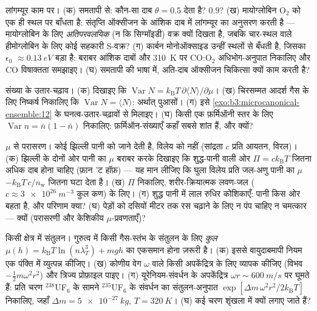 \begin{exercise}[$\star\star$]\label{exo:b3:grand-canonical:6}
लांगम्यूर काम पर। (क) समतापी से: कौन-सा दाब
$\theta = 0.5$ देता है? $0.9$? (ख) मायोग्लोबिन O$_2$ को एक ही स्थल
पर बाँधता है: संतृप्ति ऑक्सीजन के आंशिक दाब में लांगम्यूर का
अनुसरण करती है --- मायोग्लोबिन के लिए \emph{अतिपरवलयिक} (न कि
सिग्मॉइडी) वक्र क्यों दिखता है, जबकि चार-स्थल वाले हीमोग्लोबिन के लिए
कोई सहकारी S-वक्र? (ग) कार्बन मोनोऑक्साइड उन्हीं स्थलों से बँधती है,
जिसका $\epsilon_0$ $\approx\qty{0.13}{eV}$ बड़ा है: बराबर आंशिक दाबों
और \qty{310}{K} पर CO:O$_2$ अधिभोग-अनुपात निकालिए और CO विषाक्तता
समझाइए। (घ) समतापी की भाषा में, अति-दाब ऑक्सीजन चिकित्सा क्यों काम
करती है?
\end{exercise}

\begin{exercise}[$\star\star$]\label{exo:b3:grand-canonical:7}
संख्या के उतार-चढ़ाव। (क) दिखाइए कि $\operatorname{Var}N =
k_{\text{B}}T\,\partial\langle N\rangle/\partial\mu$। (ख) चिरसम्मत
आदर्श गैस के लिए निष्कर्ष निकालिए कि $\operatorname{Var}N = \langle
N\rangle$: अर्थात् पुआसों। (ग) इसे
\cref{exo:b3:microcanonical-ensemble:12} के घनत्व-उतार-चढ़ावों से
मिलाइए। (घ) किसी एक फ़र्मिऑनी स्तर के लिए
$\operatorname{Var}n = \bar n(1 - \bar
n)$ निकालिए: फ़र्मिऑन-संख्याएँ कहाँ सबसे शांत हैं, और क्यों?
\end{exercise}

\begin{exercise}[$\star\star$]\label{exo:b3:grand-canonical:8}
$\mu$ से परासरण। कोई झिल्ली पानी को जाने देती है, विलेय को नहीं
(सांद्रता $c$ प्रति आयतन, विरल)। (क) झिल्ली के दोनों ओर पानी का $\mu$
बराबर करके दिखाइए कि शुद्ध-पानी वाली ओर
$\Pi = ck_{\text{B}}T$ जितना अधिक दाब होना चाहिए (फ़ान 'ट हॉफ़) ---
यह मान लीजिए कि घुला विलेय प्रति जल-अणु पानी का $\mu$
$-k_{\text{B}}T\,c/n_{\text{w}}$ जितना घटा देता है। (ख)
$\Pi$ निकालिए, शरीर-क्रियात्मक लवण-जल ($c \approx \qty{3e26}{m^{-3}}$
कुल कण) के लिए। (ग) शुद्ध पानी में लाल रुधिर कोशिकाएँ: पानी किस ओर
बहता है, और परिणाम क्या? (घ) पेड़ों को दसियों मीटर तक रस चढ़ाने के
लिए न पंप चाहिए न चमत्कार --- क्यों (परासरणी और केशिकीय
$\mu$-प्रवणताएँ)?
\end{exercise}

\begin{exercise}[$\star\star$]\label{exo:b3:grand-canonical:9}
किसी क्षेत्र में संतुलन। गुरुत्व में किसी गैस-स्तंभ के संतुलन के लिए
\emph{कुल}  $\mu(h) =
k_{\text{B}}T\ln(n\lambda_T^3) + mgh$ का एकसमान होना ज़रूरी है। (क)
इससे वायुदाबमापी नियम एक पंक्ति में व्युत्पन्न कीजिए। (ख) कोणीय वेग
$\omega$ वाले किसी अपकेंद्रित्र के लिए व्यापक कीजिए (विभव
$-\tfrac12 m\omega^2r^2$) और त्रिज्य प्रोफ़ाइल पाइए। (ग)
यूरेनियम-संवर्धन के अपकेंद्रित्र $\omega r \sim
\qty{600}{m/s}$ पर घूमते हैं: प्रति चरण $^{238}$UF$_6$ के सामने
$^{235}$UF$_6$ के संवर्धन का संतुलन-अनुपात $\exp[\Delta m\,\omega^2
r^2/2k_{\text{B}}T]$ निकालिए, जहाँ $\Delta m = \qty{5e-27}{kg}$, $T =
\qty{320}{K}$। (घ) कई चरण शृंखला में क्यों लगाए जाते हैं?
\end{exercise}

